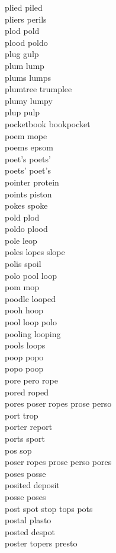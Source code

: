 plied piled\\
pliers perils\\
plod pold\\
plood poldo\\
plug gulp\\
plum lump\\
plums lumps\\
plumtree trumplee\\
plumy lumpy\\
plup pulp\\
pocketbook bookpocket\\
poem mope\\
poems epsom\\
poet's poets'\\
poets' poet's\\
pointer protein\\
points piston\\
pokes spoke\\
pold plod\\
poldo plood\\
pole leop\\
poles lopes slope\\
polis spoil\\
polo pool loop\\
pom mop\\
poodle looped\\
pooh hoop\\
pool loop polo\\
pooling looping\\
pools loops\\
poop popo\\
popo poop\\
pore pero rope\\
pored roped\\
pores poser ropes prose perso\\
port trop\\
porter report\\
ports sport\\
pos sop\\
poser ropes prose perso pores\\
poses posse\\
posited deposit\\
posse poses\\
post spot stop tops pots\\
postal plasto\\
posted despot\\
poster topers presto\\
